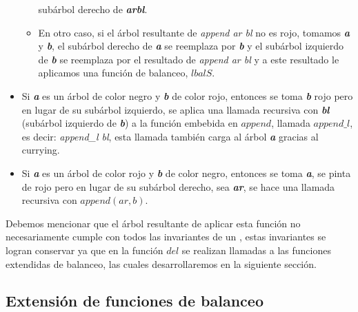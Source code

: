 \begin{itemize}
\begin{itemize}
      subárbol derecho de \textbf{\textit{arbl}}.
      \item En otro caso, si el \'arbol resultante de \textit{append ar bl} no es rojo, tomamos 
      \textbf{\textit{a}} y \textbf{\textit{b}}, el subárbol derecho de \textbf{\textit{a}} se 
      reemplaza por \textbf{\textit{b}} y el subárbol izquierdo de \textbf{\textit{b}} se reemplaza 
      por el resultado de \textit{append ar bl} y a este resultado le aplicamos una función de 
      balanceo, \hyperref[lbalS]{$lbalS$}.
    \end{itemize}
    \item Si \textbf{\textit{a}} es un \'arbol de color negro y \textbf{\textit{b}} de color rojo,
    entonces se toma \textbf{\textit{b}} rojo pero en lugar de su subárbol izquierdo, se aplica una 
    llamada recursiva con \textbf{\textit{bl}} (sub\'arbol izquierdo de \textbf{\textit{b}}) a la 
    funci\'on embebida en \hyperref[func_app]{$append$}, llamada $append\_l$, es decir: \textit{append\_l bl}, esta 
    llamada tambi\'en carga al \'arbol \textbf{\textit{a}} gracias al currying\cite{Currying}.
    \item Si \textbf{\textit{a}} es un \'arbol de color rojo y \textbf{\textit{b}} de color negro,
    entonces se toma \textbf{\textit{a}}, se pinta de rojo pero en lugar de su subárbol derecho, sea
    \textbf{\textit{ar}}, se hace una llamada recursiva con $append(ar,b)$.
\end{itemize}

Debemos mencionar que el \'arbol resultante de aplicar esta funci\'on no necesariamente cumple con 
todos las invariantes de un {\arn}, estas invariantes se logran conservar ya que en la funci\'on 
\hyperref[func_del]{$del$} se realizan llamadas a las funciones extendidas de balanceo, las cuales desarrollaremos en la 
siguiente sección.

\subsection{Extensi\'on de funciones de balanceo}

